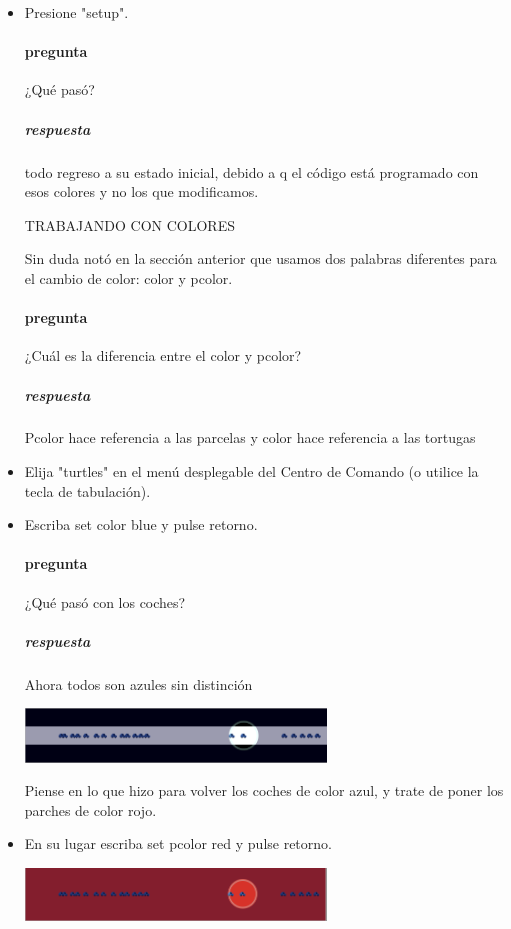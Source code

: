 \documentclass[12pt,letterpaper]{article}
\begin{document}
\begin{itemize}
\item Presione "setup".

\paragraph{pregunta}¿Qué pasó?
\subparagraph{respuesta}todo regreso a su estado inicial, debido a q el código está programado con esos colores y no los que modificamos.

\begin{center}
	TRABAJANDO CON COLORES
\end{center}

Sin duda notó en la sección anterior que usamos dos palabras diferentes para el cambio de color: color y pcolor.

\paragraph{pregunta}¿Cuál es la diferencia entre el color y pcolor?
\subparagraph{respuesta}Pcolor hace referencia a las parcelas y color hace referencia a las tortugas

\item Elija "turtles" en el menú desplegable del Centro de Comando (o utilice la tecla de tabulación).
\item Escriba set color blue y pulse retorno.

\paragraph{pregunta} ¿Qué pasó con los coches?
\subparagraph{respuesta}Ahora todos son azules sin distinción

\begin{center}
	\includegraphics[width=8cm]{./imagenes/image7.png}
\end{center}


Piense en lo que hizo para volver los coches de color azul, y trate de poner los parches de color rojo.

\item En su lugar escriba set pcolor red y pulse retorno.

\begin{center}
	\includegraphics[width=8cm]{./imagenes/image8.png}
\end{center}


\end{itemize}
\end{document}
